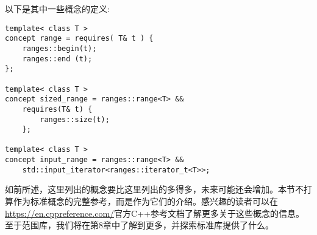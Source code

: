 以下是其中一些概念的定义:

\begin{lstlisting}[style=styleCXX]
template< class T >
concept range = requires( T& t ) {
	ranges::begin(t);
	ranges::end (t);
};

template< class T >
concept sized_range = ranges::range<T> &&
	requires(T& t) {
		ranges::size(t);
	};

template< class T >
concept input_range = ranges::range<T> &&
	std::input_iterator<ranges::iterator_t<T>>;
\end{lstlisting}

如前所述，这里列出的概念要比这里列出的多得多，未来可能还会增加。本节不打算作为标准概念的完整参考，而是作为它们的介绍。感兴趣的读者可以在\url{https://en.cppreference.com/}官方C++参考文档了解更多关于这些概念的信息。至于范围库，我们将在第8章中了解到更多，并探索标准库提供了什么。































